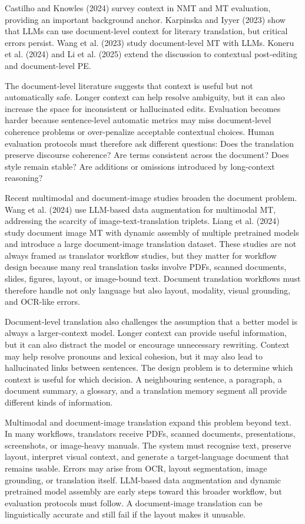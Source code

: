 \documentclass[11pt]{article}
\begin{document}
Castilho and Knowles (2024) survey context in NMT and MT evaluation, providing an important background anchor. Karpinska and Iyyer (2023) show that LLMs can use document-level context for literary translation, but critical errors persist. Wang et al. (2023) study document-level MT with LLMs. Koneru et al. (2024) and Li et al. (2025) extend the discussion to contextual post-editing and document-level PE.

The document-level literature suggests that context is useful but not automatically safe. Longer context can help resolve ambiguity, but it can also increase the space for inconsistent or hallucinated edits. Evaluation becomes harder because sentence-level automatic metrics may miss document-level coherence problems or over-penalize acceptable contextual choices. Human evaluation protocols must therefore ask different questions: Does the translation preserve discourse coherence? Are terms consistent across the document? Does style remain stable? Are additions or omissions introduced by long-context reasoning?

Recent multimodal and document-image studies broaden the document problem. Wang et al. (2024) use LLM-based data augmentation for multimodal MT, addressing the scarcity of image-text-translation triplets. Liang et al. (2024) study document image MT with dynamic assembly of multiple pretrained models and introduce a large document-image translation dataset. These studies are not always framed as translator workflow studies, but they matter for workflow design because many real translation tasks involve PDFs, scanned documents, slides, figures, layout, or image-bound text. Document translation workflows must therefore handle not only language but also layout, modality, visual grounding, and OCR-like errors.


Document-level translation also challenges the assumption that a better model is always a larger-context model. Longer context can provide useful information, but it can also distract the model or encourage unnecessary rewriting. Context may help resolve pronouns and lexical cohesion, but it may also lead to hallucinated links between sentences. The design problem is to determine which context is useful for which decision. A neighbouring sentence, a paragraph, a document summary, a glossary, and a translation memory segment all provide different kinds of information.

Multimodal and document-image translation expand this problem beyond text. In many workflows, translators receive PDFs, scanned documents, presentations, screenshots, or image-heavy manuals. The system must recognise text, preserve layout, interpret visual context, and generate a target-language document that remains usable. Errors may arise from OCR, layout segmentation, image grounding, or translation itself. LLM-based data augmentation and dynamic pretrained model assembly are early steps toward this broader workflow, but evaluation protocols must follow. A document-image translation can be linguistically accurate and still fail if the layout makes it unusable.
\end{document}
